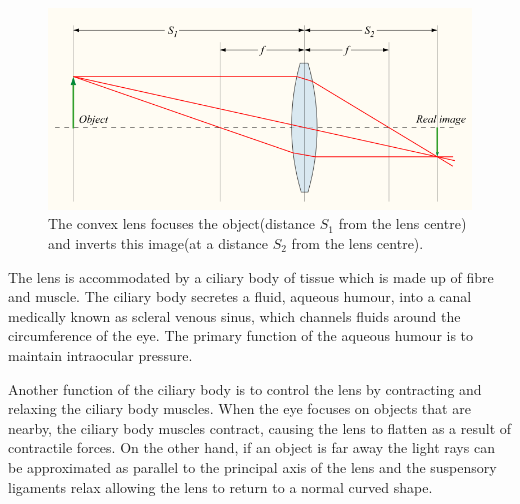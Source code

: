 \begin{figure}[H]
\centering
  \includegraphics{figures/convergent_lens2}
\caption{The convex lens focuses the object(distance $S_1$ from the lens centre)
         and inverts this image(at a distance $S_2$ from the lens centre).
         \cite{greivenkamp2004field}}
\label{fig:convergent_lens}
\end{figure}

The lens is accommodated by a ciliary body of tissue which is made up of fibre and
muscle. The ciliary body secretes a fluid, aqueous humour,  into a canal medically
known as scleral venous sinus, which channels fluids around the circumference of the
eye.\cite{bill1970effects,dvorak1934schlemm} The primary function of the aqueous
humour is to maintain intraocular pressure.

Another function of the ciliary body is to control the lens by contracting and relaxing the
ciliary body muscles. When the eye focuses on objects that are nearby, the ciliary body
muscles contract, causing the lens to flatten as a result of contractile forces. On the
other hand, if an  object is far away the light rays can be approximated as parallel to the
principal axis of the lens and the suspensory ligaments relax allowing the lens to return
to a normal curved shape.


